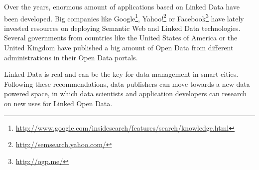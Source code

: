 Over the years, enormous amount of applications based on Linked Data have been developed. Big companies like Google\footnote{\url{http://www.google.com/insidesearch/features/search/knowledge.html}}, Yahoo!\footnote{\url{http://semsearch.yahoo.com/}} or Facebook\footnote{\url{http://ogp.me/}} have lately invested resources on deploying Semantic Web and Linked Data technologies. Several governments from countries like the United States of America or the United Kingdom have published a big amount of Open Data from different administrations in their Open Data portals.

Linked Data is real and can be the key for data management in smart cities. Following these recommendations, data publishers can move towards a new data-powered space, in which data scientists and application developers can research on new uses for Linked Open Data.
